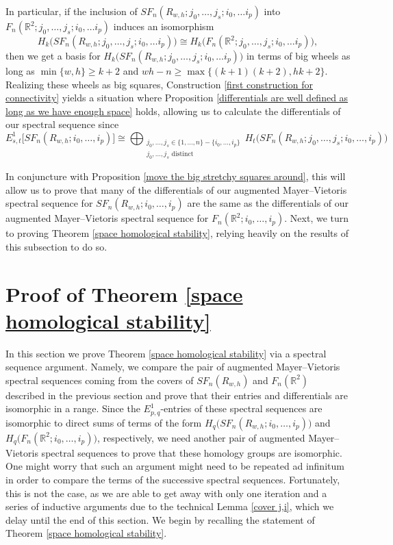 \documentclass[pagebackref,colorlinks,citecolor=blue,linkcolor=blue,urlcolor=blue,filecolor=blue]{article}
\theoremstyle{definition}\newtheorem{definition}[thm]{Definition}
\theoremstyle{definition}
\newcommand{\R}{\ensuremath{\mathbb{R}}}
\begin{document}
In particular, if the inclusion of $SF_{n}(R_{w,h}; j_{0}, \dots, j_{s}; i_{0}, \dots i_{p})$ into $F_{n}(\R^{2}; j_{0}, \dots, j_{s}; i_{0}, \dots i_{p})$ induces an isomorphism 
\[
H_{k}\big(SF_{n}(R_{w,h}; j_{0}, \dots, j_{s}; i_{0}, \dots i_{p})\big)\cong H_{k}\big(F_{n}(\R^{2}; j_{0}, \dots, j_{s}; i_{0}, \dots i_{p})\big),
\]
then we get a basis for $H_{k}\big(SF_{n}(R_{w,h}; j_{0}, \dots, j_{s}; i_{0}, \dots i_{p})\big)$ in terms of big wheels as long as $\min\{w,h\}\ge k+2$ and $wh-n\ge \max\big\{(k+1)(k+2), hk+2\big\}$.
Realizing these wheels as big squares, Construction \ref{first construction for connectivity} yields a situation where Proposition \ref{differentials are well defined as long as we have enough space} holds, allowing us to calculate the differentials of our spectral sequence since
\[
E^{1}_{s,t}\big[SF_{n}(R_{w,h}; i_{0}, \dots, i_{p})\big]\cong \bigoplus_{\substack{j_{0}, \dots, j_{s}\in \{1,\dots, n\}-\{i_{0}, \dots, i_{p}\}\\j_{0}, \dots, j_{s} \text{ distinct}}} H_{t}\big(SF_{n}(R_{w, h}; j_{0}, \dots, j_{s}; i_{0}, \dots, i_{p})\big)
\]

In conjuncture with Proposition \ref{move the big stretchy squares around}, this will allow us to prove that many of the differentials of our augmented Mayer--Vietoris spectral sequence for $SF_{n}(R_{w,h}; i_{0},\dots, i_{p})$ are the same as the differentials of our augmented Mayer--Vietoris spectral sequence for $F_{n}(\R^{2}; i_{0},\dots, i_{p})$.
Next, we turn to proving Theorem \ref{space homological stability}, relying heavily on the results of this subsection to do so.

\section{Proof of Theorem \ref{space homological stability}}\label{section main theorem}

In this section we prove Theorem \ref{space homological stability} via a spectral sequence argument.
Namely, we compare the pair of augmented Mayer--Vietoris spectral sequences coming from the covers of $SF_{n}(R_{w, h})$ and $F_{n}(\R^{2})$ described in the previous section and prove that their entries and differentials are isomorphic in a range.
Since the $E^{1}_{p,q}$-entries of these spectral sequences are isomorphic to direct sums of terms of the form $H_{q}\big(SF_{n}(R_{w, h};i_{0},\dots, i_{p})\big)$ and $H_{q}\big(F_{n}(\R^{2};i_{0},\dots, i_{p})\big)$, respectively, we need another pair of augmented Mayer--Vietoris spectral sequences to prove that these homology groups are isomorphic.
One might worry that such an argument might need to be repeated ad infinitum in order to compare the terms of the successive spectral sequences.
Fortunately, this is not the case, as we are able to get away with only one iteration and a series of inductive arguments due to the technical Lemma \ref{cover j,i}, which we delay until the end of this section.
We begin by recalling the statement of Theorem \ref{space homological stability}.
\end{document}
